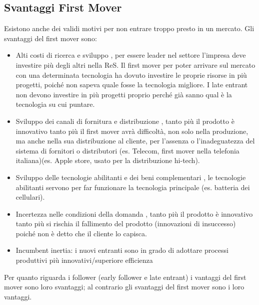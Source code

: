 \documentclass{article}
\begin{document}
\subsection {Svantaggi First Mover}
Esistono anche dei validi motivi per non entrare troppo presto in un mercato. Gli svantaggi del first
mover sono:
\begin{itemize}
\item Alti costi di ricerca e sviluppo , per essere leader nel settore l’impresa deve investire più
degli altri nella ReS. Il first mover per poter arrivare sul mercato con una determinata
tecnologia ha dovuto investire le proprie risorse in più progetti, poiché non sapeva quale
fosse la tecnologia migliore. I late entrant non devono investire in più progetti proprio
perché già sanno qual è la tecnologia su cui puntare.
\item Sviluppo dei canali di fornitura e distribuzione , tanto più il prodotto è innovativo tanto più
il first mover avrà difficoltà, non solo nella produzione, ma anche nella sua distribuzione al
cliente, per l’assenza o l’inadeguatezza del sistema di fornitori o distributori (es. Telecom,
first mover nella telefonia italiana)(es. Apple store, usato per la distribuzione hi-tech).
\item Sviluppo delle tecnologie abilitanti e dei beni complementari , le tecnologie abilitanti
servono per far funzionare la tecnologia principale (es. batteria dei cellulari).
\item Incertezza nelle condizioni della domanda , tanto più il prodotto è innovativo tanto più si
rischia il fallimento del prodotto (innovazioni di insuccesso) poiché non è detto che il
cliente lo capisca.
\item Incumbent inertia: i nuovi entranti sono in grado di adottare processi
produttivi più innovativi/superiore efficienza
\end{itemize}
Per quanto riguarda i follower (early follower e late entrant) i vantaggi del first mover sono loro
svantaggi; al contrario gli svantaggi del first mover sono i loro vantaggi.
\end{document}
